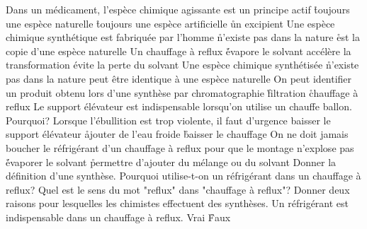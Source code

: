 \q
Dans un médicament, l'espèce chimique agissante est
\rv
un principe actif
\r
toujours une espèce naturelle
\r
toujours une espèce artificielle
\r
un excipient
\q
Une espèce chimique synthétique
\rv
est fabriquée par l'homme
\r
n'existe pas dans la nature
\r
est la copie d'une espèce naturelle
\q
Un chauffage à reflux
\r
évapore le solvant
\rv
accélère la transformation
\rv
évite la perte du solvant
\q
Une espèce chimique synthétisée
\r
n'existe pas dans la nature
\rv
peut être identique à une espèce naturelle
\q
On peut identifier un produit obtenu lors d'une synthèse par
\rv
chromatographie
\r
filtration
\r
chauffage à reflux
\q
Le support élévateur est indispensable lorsqu'on utilise un chauffe ballon. Pourquoi?
\q
Lorsque l'ébullition est trop violente, il faut d'urgence
\rv
baisser le support élévateur
\r
ajouter de l'eau froide
\r
baisser le chauffage
\q
On ne doit jamais boucher le réfrigérant d'un chauffage à reflux pour
\rv
que le montage n'explose pas
\r
évaporer le solvant
\r
permettre d'ajouter du mélange ou du solvant
\q
Donner la définition d'une synthèse.
\q
Pourquoi utilise-t-on un réfrigérant dans un chauffage à reflux?
\q
Quel est le sens du mot "reflux" dans "chauffage à reflux"?
\q
Donner deux raisons pour lesquelles les chimistes effectuent des synthèses.
\q
Un réfrigérant est indispensable dans un chauffage à reflux.
\rv
Vrai
\r
Faux



